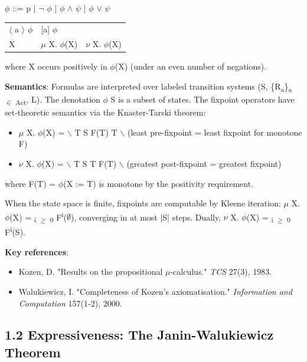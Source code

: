 \documentclass[11pt]{article}
\begin{document}
\(\phi\) ::= p | \(\neg{}\) \(\phi\) | \(\phi\) \(\land\) \(\psi\) | \(\phi\) \(\lor\) \(\psi\)
\begin{center}
\begin{tabular}{ll}
\(\langle\) a \(\rangle\) \(\phi\) & {[}a] \(\phi\)\\
X & \(\mu\) X. \(\phi\)(X) & \(\nu\) X. \(\phi\)(X)\\
\end{tabular}
\end{center}

where X occurs positively in \(\phi\)(X) (under an even number of negations).

\textbf{Semantics}: Formulas are interpreted over labeled transition systems
(S, \{R\textsubscript{a}\}\textsubscript{a \(\in\) Act}, L). The denotation \llbracket \(\phi\) \rrbracket \subseteq S
is a subset of states. The fixpoint operators have set-theoretic semantics via
the Knaster-Tarski theorem:

\begin{itemize}
\item \llbracket \(\mu\) X. \(\phi\)(X) \rrbracket = \bigcap $\backslash${ T \subseteq S \mid F(T) \subseteq T $\backslash$}
(least pre-fixpoint = least fixpoint for monotone F)
\item \llbracket \(\nu\) X. \(\phi\)(X) \rrbracket = \bigcup $\backslash${ T \subseteq S \mid T \subseteq F(T) $\backslash$}
(greatest post-fixpoint = greatest fixpoint)
\end{itemize}

where F(T) = \llbracket \(\phi\)(X := T) \rrbracket is monotone by the positivity
requirement.

When the state space is finite, fixpoints are computable by Kleene iteration:
\(\mu\) X. \(\phi\)(X) = \bigcup\textsubscript{i \(\ge\) 0} F\textsuperscript{i}(\(\emptyset\)), converging in at most |S| steps.
Dually, \(\nu\) X. \(\phi\)(X) = \bigcap\textsubscript{i \(\ge\) 0} F\textsuperscript{i}(S).

\textbf{Key references}:
\begin{itemize}
\item Kozen, D. "Results on the propositional \(\mu\)-calculus." \emph{TCS} 27(3), 1983.
\item Walukiewicz, I. "Completeness of Kozen's axiomatisation." \emph{Information and Computation} 157(1-2), 2000.
\end{itemize}
\subsection{1.2 Expressiveness: The Janin-Walukiewicz Theorem}
\label{sec:org1fd1d4a}
\end{document}
